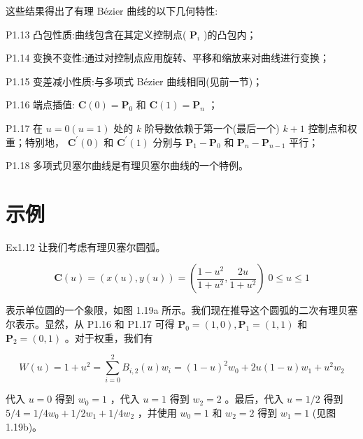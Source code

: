 \documentclass[../main.tex]{subfiles}
\begin{document}
这些结果得出了有理 Bézier 曲线的以下几何特性:

P1.13 凸包性质:曲线包含在其定义控制点( \({\mathbf{P}}_{i}\) )的凸包内；

P1.14 变换不变性:通过对控制点应用旋转、平移和缩放来对曲线进行变换；

P1.15 变差减小性质:与多项式 Bézier 曲线相同(见前一节)；

P1.16 端点插值: \(\mathbf{C}\left( 0\right)  = {\mathbf{P}}_{0}\) 和 \(\mathbf{C}\left( 1\right)  = {\mathbf{P}}_{n}\) ；

P1.17 在 \(u = 0\left( {u = 1}\right)\) 处的 \(k\) 阶导数依赖于第一个(最后一个) \(k + 1\) 控制点和权重；特别地， \({\mathbf{C}}^{\prime }\left( 0\right)\) 和 \({\mathbf{C}}^{\prime }\left( 1\right)\) 分别与 \({\mathbf{P}}_{1} - {\mathbf{P}}_{0}\) 和 \({\mathbf{P}}_{n} - {\mathbf{P}}_{n - 1}\) 平行；

P1.18 多项式贝塞尔曲线是有理贝塞尔曲线的一个特例。


\section*{示例}

\noindent\begin{minipage}{\linewidth}
Ex1.12 让我们考虑有理贝塞尔圆弧。

\[
\mathbf{C}\left( u\right)  = \left( {x\left( u\right) ,y\left( u\right) }\right)  = \left( {\frac{1 - {u}^{2}}{1 + {u}^{2}},\frac{2u}{1 + {u}^{2}}}\right) \;0 \leq  u \leq  1
\]

表示单位圆的一个象限，如图 1.19a 所示。我们现在推导这个圆弧的二次有理贝塞尔表示。显然，从 P1.16 和 P1.17 可得 \({\mathbf{P}}_{0} = \left( {1,0}\right) ,{\mathbf{P}}_{1} = \left( {1,1}\right)\) 和 \({\mathbf{P}}_{2} = \left( {0,1}\right)\) 。对于权重，我们有

\[
W\left( u\right)  = 1 + {u}^{2} = \mathop{\sum }\limits_{{i = 0}}^{2}{B}_{i,2}\left( u\right) {w}_{i} = {\left( 1 - u\right) }^{2}{w}_{0} + {2u}\left( {1 - u}\right) {w}_{1} + {u}^{2}{w}_{2}
\]


代入 \(u = 0\) 得到 \({w}_{0} = 1\) ，代入 \(u = 1\) 得到 \({w}_{2} = 2\) 。最后，代入 \(u = 1/2\) 得到 \(5/4 = 1/4{w}_{0} + 1/2{w}_{1} + 1/4{w}_{2}\) ，并使用 \({w}_{0} = 1\) 和 \({w}_{2} = 2\) 得到 \({w}_{1} = 1\) (见图 1.19b)。

\begin{center}
\begin{minipage}{15cm}
\centering
{}
\captionsetup{font=small,skip=6pt,justification=centering}
\end{minipage}
\end{center}
\end{minipage}
\par\medskip
\end{document}
